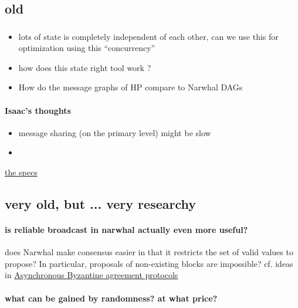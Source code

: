 \documentclass{article}
\theoremstyle{definition}
\begin{document}
\subsection{old}

\subsubsection{}


\begin{itemize}
\item
  lots of state is completely independent of each other, 
  can we use this for optimization using this ``concurrency''
\item 
  how does this state right tool work ? 
\item 
  How do the message graphs of HP
  compare to Narwhal DAGs
\end{itemize}
\paragraph{Isaac's thoughts}

\begin{itemize}
\item message sharing (on the primary level) might be slow
\item 
\end{itemize}

\href{%
https://github.com/anoma/specs/blob/main/src/architecture/consensus/typhon/mempool.md%
}{the specs}

\subsection{very old, but ... very researchy}

\paragraph{is reliable broadcast in narwhal actually even more useful?}
does Narwhal make consensus easier
in that it restricts the set of valid values to propose?
In particular,
proposals of non-existing blocks are impossible?
cf. ideas in
\href{https://www.sciencedirect.com/science/article/pii/089054018790054X}{Asynchronous Byzantine agreement protocols}


\paragraph{what can be gained by randomness? at what price?}
\end{document}
